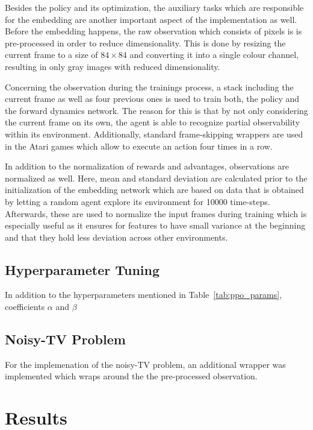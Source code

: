 \documentclass[draft,final]{vutinfth} %
\begin{document}
    Besides the policy and its optimization, the auxiliary tasks which are responsible for the embedding are another important aspect of the implementation as well.
    Before the embedding happens, the raw observation which consists of pixels is is pre-processed in order to reduce dimensionality.
    This is done by resizing the current frame to a size of $84 \times 84$ and converting it into a single colour channel, resulting in only gray images with reduced dimensionality.

    Concerning the observation during the trainings process, a stack including the current frame as well as four previous ones is used to train both, the policy and the forward dynamics network.
    The reason for this is that by not only considering the current frame on its own, the agent is able to recognize partial observability within its environment.
    Additionally, standard frame-skipping wrappers are used in the Atari games which allow to execute an action four times in a row.

    In addition to the normalization of rewards and advantages, observations are normalized as well.
    Here, mean and standard deviation are calculated prior to the initialization of the embedding network which are based on data that is obtained by letting a random agent explore its environment for 10000 time-steps.
    Afterwards, these are used to normalize the input frames during training which is especially useful as it ensures for features to have small variance at the beginning and that they hold less deviation across other environments.

    \section{Hyperparameter Tuning}

    In addition to the hyperparameters mentioned in Table~\ref{tab:ppo_params}, coefficients $\alpha$ and $\beta$


    \section{Noisy-TV Problem}
    \citep{schmidhuber_formal_2010}

    For the implemenation of the noisy-TV problem, an additional wrapper was implemented which wraps around the the pre-processed observation.

    \glsresetall


    \chapter{Results}\label{ch:results}
\end{document}
